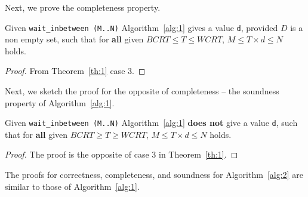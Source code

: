 Next, we prove the completeness property.
\begin{theorem}
  Given \texttt{wait\_inbetween (M..N)} Algorithm~\ref{alg:1} gives a
  value \texttt{d}, provided $D$ is a non empty set, such that for
  \textbf{all} given $BCRT \leq T \leq WCRT$, $M \leq T \times d \leq N$
  holds.
\end{theorem}
\begin{proof}
  From Theorem~\ref{th:1} case 3.
\end{proof}

Next, we sketch the proof for the opposite of completeness -- the
soundness property of Algorithm~\ref{alg:1}.

\begin{theorem}
  Given \texttt{wait\_inbetween (M..N)} Algorithm~\ref{alg:1}
  \textbf{does not} give a value \texttt{d}, such that for \textbf{all}
  given $BCRT \geq T \geq WCRT$, $M \leq T \times d \leq N$ holds.
\end{theorem}

\begin{proof}
  The proof is the opposite of case 3 in Theorem~\ref{th:1}.
\end{proof}

The proofs for correctness, completeness, and soundness for
Algorithm~\ref{alg:2} are similar to those of Algorithm~\ref{alg:1}.

